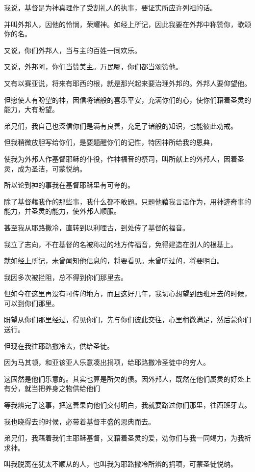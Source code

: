 \documentclass[12pt,oneside]{book}
\begin{document}
我说，基督是为神真理作了受割礼人的执事，要证实所应许列祖的话。

并叫外邦人，因他的怜悯，荣耀神。如经上所记，因此我要在外邦中称赞你，歌颂你的名。

又说，你们外邦人，当与主的百姓一同欢乐。

又说，外邦阿，你们当赞美主。万民哪，你们都当颂赞他。

又有以赛亚说，将来有耶西的根，就是那兴起来要治理外邦的。外邦人要仰望他。

但愿使人有盼望的神，因信将诸般的喜乐平安，充满你们的心，使你们藉着圣灵的能力，大有盼望。

弟兄们，我自己也深信你们是满有良善，充足了诸般的知识，也能彼此劝戒。

但我稍微放胆写给你们，是要题醒你们的记性，特因神所给我的恩典，

使我为外邦人作基督耶稣的仆役，作神福音的祭司，叫所献上的外邦人，因着圣灵，成为圣洁，可蒙悦纳。

所以论到神的事我在基督耶稣里有可夸的。

除了基督藉我作的那些事，我什么都不敢题。只题他藉我言语作为，用神迹奇事的能力，并圣灵的能力，使外邦人顺服。

甚至我从耶路撒冷，直转到以利哩古，到处传了基督的福音。

我立了志向，不在基督的名被称过的地方传福音，免得建造在别人的根基上。

就如经上所记，未曾闻知他信息的，将要看见。未曾听过的，将要明白。

我因多次被拦阻，总不得到你们那里去。

但如今在这里再没有可传的地方，而且这好几年，我切心想望到西班牙去的时候，可以到你们那里。

盼望从你们那里经过，得见你们，先与你们彼此交往，心里稍微满足，然后蒙你们送行。

但现在我往耶路撒冷去，供给圣徒。

因为马其顿，和亚该亚人乐意凑出捐项，给耶路撒冷圣徒中的穷人。

这固然是他们乐意的。其实也算是所欠的债。因外邦人，既然在他们属灵的好处上有分，就当把养身之物供给他们

等我辨完了这事，把这善果向他们交付明白，我就要路过你们那里，往西班牙去。

我也晓得去的时候，必带着基督丰盛的恩典而去。

弟兄们，我藉着我们主耶稣基督，又藉着圣灵的爱，劝你们与我一同竭力，为我祈求神。

叫我脱离在犹太不顺从的人，也叫我为耶路撒冷所辨的捐项，可蒙圣徒悦纳。
\end{document}

